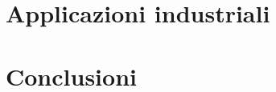 \clearpage{\pagestyle{plain}\cleardoublepage} %
\chapter{Applicazioni industriali} %
\label{chapter:chapter5} %

\clearpage{\pagestyle{plain}\cleardoublepage} %
\chapter{Conclusioni} %
\label{chapter:chapter6} %

\clearpage{\pagestyle{plain}\cleardoublepage}
\nocite{yt_tutorial}
\nocite{moveit_tutorial}
\nocite{cao2021six}
\nocite{lee2015capacitive}
\nocite{ur5}
\printbibliography[nottype=online, heading=subbibliography, title=Bibliografia]
\printbibliography[type=online, heading=subbibliography, title=Sitografia]
